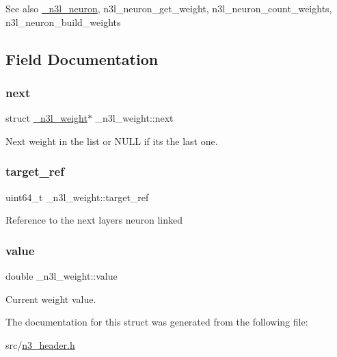 \begin{DoxySeeAlso}{See also}
\hyperlink{struct__n3l__neuron}{\+\_\+n3l\+\_\+neuron}, n3l\+\_\+neuron\+\_\+get\+\_\+weight, n3l\+\_\+neuron\+\_\+count\+\_\+weights, n3l\+\_\+neuron\+\_\+build\+\_\+weights 
\end{DoxySeeAlso}


\subsection{Field Documentation}
\mbox{\label{struct__n3l__weight_adf96faae4820538377678c82ec96d48e}} 
\subsubsection{\texorpdfstring{next}{next}}
{\footnotesize\ttfamily struct \hyperlink{struct__n3l__weight}{\+\_\+n3l\+\_\+weight}$\ast$ \+\_\+n3l\+\_\+weight\+::next}

Next weight in the list or N\+U\+LL if it\textquotesingle{}s the last one. \mbox{\label{struct__n3l__weight_ac5094b52f09a092ffb1cdc4cc594f38f}} 
\subsubsection{\texorpdfstring{target\+\_\+ref}{target\_ref}}
{\footnotesize\ttfamily uint64\+\_\+t \+\_\+n3l\+\_\+weight\+::target\+\_\+ref}

Reference to the next layer\textquotesingle{}s neuron linked \mbox{\label{struct__n3l__weight_a1d1ebc5e04ba1dd26094993dd94aa710}} 
\subsubsection{\texorpdfstring{value}{value}}
{\footnotesize\ttfamily double \+\_\+n3l\+\_\+weight\+::value}

Current weight value. 

The documentation for this struct was generated from the following file\+:\begin{DoxyCompactItemize}
\item 
src/\hyperlink{n3__header_8h}{n3\+\_\+header.\+h}\end{DoxyCompactItemize}
